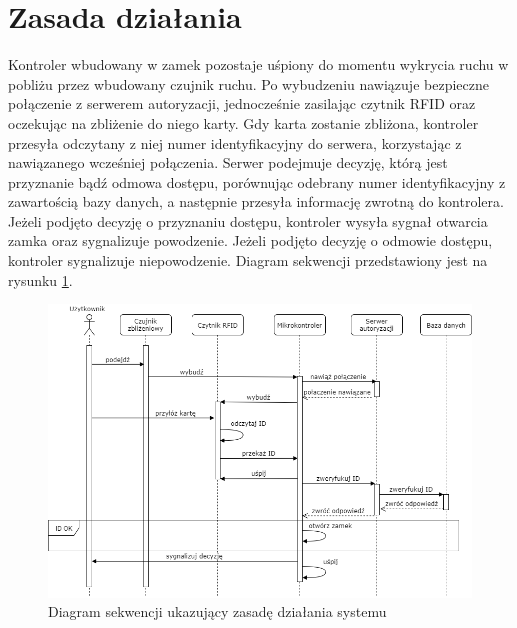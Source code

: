         \section{Zasada działania}
                Kontroler wbudowany w zamek pozostaje uśpiony do momentu wykrycia ruchu w pobliżu przez wbudowany czujnik ruchu. Po wybudzeniu nawiązuje bezpieczne połączenie z serwerem autoryzacji, jednocześnie zasilając czytnik RFID oraz oczekując na zbliżenie do niego karty. Gdy karta zostanie zbliżona, kontroler przesyła odczytany z niej numer identyfikacyjny do serwera, korzystając z nawiązanego wcześniej połączenia. Serwer podejmuje decyzję, którą jest przyznanie bądź odmowa dostępu, porównując odebrany numer identyfikacyjny z zawartością bazy danych, a następnie przesyła informację zwrotną do kontrolera. Jeżeli podjęto decyzję o przyznaniu dostępu, kontroler wysyła sygnał otwarcia zamka oraz sygnalizuje powodzenie. Jeżeli podjęto decyzję o odmowie dostępu, kontroler sygnalizuje niepowodzenie. Diagram sekwencji przedstawiony jest na rysunku \ref{fig:sequence1}.

                \begin{figure}[]
                        \includegraphics[width=\linewidth]{chapters/images/sequence1.png}
                        \caption{Diagram sekwencji ukazujący zasadę działania systemu}
                        \label{fig:sequence1}
                \end{figure}

